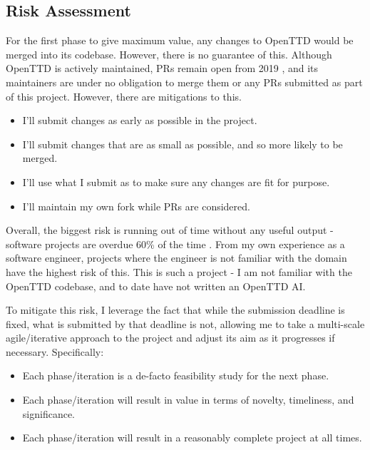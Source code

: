 \documentclass[a4paper,11pt]{article}
\begin{document}
\subsection{Risk Assessment}
\label{riskassessment}

For the first phase to give maximum value, any changes to OpenTTD would be merged into its codebase. However, there is no guarantee of this. Although OpenTTD is actively maintained, PRs remain open from 2019 \cite{openTTDPRs}, and its maintainers are under no obligation to merge them or any PRs submitted as part of this project. However, there are mitigations to this.

\begin{itemize}
    \item I'll submit changes as early as possible in the project.
    \item I'll submit changes that are as small as possible, and so more likely to be merged.
    \item I'll use what I submit as to make sure any changes are fit for purpose.
    \item I'll maintain my own fork while PRs are considered.
\end{itemize}

Overall, the biggest risk is running out of time without any useful output - software projects are overdue 60\% of the time \cite{chaos2015}. From my own experience as a software engineer, projects where the engineer is not familiar with the domain have the highest risk of this. This is such a project - I am not familiar with the OpenTTD codebase, and to date have not written an OpenTTD AI.

To mitigate this risk, I leverage the fact that while the submission deadline is fixed, what is submitted by that deadline is not, allowing me to take a multi-scale agile/iterative approach to the project and adjust its aim as it progresses if necessary. Specifically:

\begin{itemize}
    \item Each phase/iteration is a de-facto feasibility study for the next phase.
    \item Each phase/iteration will result in value in terms of novelty, timeliness, and significance.
    \item Each phase/iteration will result in a reasonably complete project at all times.
\end{itemize}
\end{document}
